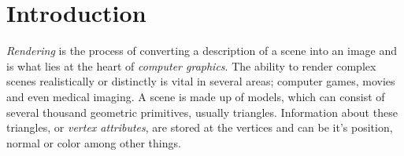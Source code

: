 


\chapter{Introduction}




\textit{Rendering} is the process of converting a description of a
scene into an image and is what lies at the heart of \textit{computer
  graphics}. The ability to render complex scenes realistically or
distinctly is vital in several areas; computer games, movies and even
medical imaging. A scene is made up of models, which can consist of
several thousand geometric primitives, usually triangles. Information
about these triangles, or \textit{vertex attributes}, are stored at
the vertices and can be it's position, normal or color among other
things.


